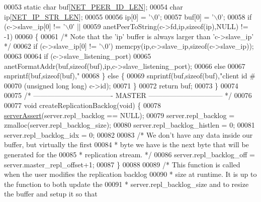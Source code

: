 \begin{DoxyCode}
00053     \textcolor{keyword}{static} \textcolor{keywordtype}{char} buf[\hyperlink{server_8h_a39a30f77e23c1994e70b6c9bc892dee9}{NET\_PEER\_ID\_LEN}];
00054     \textcolor{keywordtype}{char} ip[\hyperlink{server_8h_ad97c5405ed22a94e9fcc10fba577d6c0}{NET\_IP\_STR\_LEN}];
00055 
00056     ip[0] = \textcolor{stringliteral}{'\(\backslash\)0'};
00057     buf[0] = \textcolor{stringliteral}{'\(\backslash\)0'};
00058     \textcolor{keywordflow}{if} (c->slave\_ip[0] != \textcolor{stringliteral}{'\(\backslash\)0'} ||
00059         anetPeerToString(c->fd,ip,\textcolor{keyword}{sizeof}(ip),NULL) != -1)
00060     \{
00061         \textcolor{comment}{/* Note that the 'ip' buffer is always larger than 'c->slave\_ip' */}
00062         \textcolor{keywordflow}{if} (c->slave\_ip[0] != \textcolor{stringliteral}{'\(\backslash\)0'}) memcpy(ip,c->slave\_ip,\textcolor{keyword}{sizeof}(c->slave\_ip));
00063 
00064         \textcolor{keywordflow}{if} (c->slave\_listening\_port)
00065             anetFormatAddr(buf,\textcolor{keyword}{sizeof}(buf),ip,c->slave\_listening\_port);
00066         \textcolor{keywordflow}{else}
00067             snprintf(buf,\textcolor{keyword}{sizeof}(buf),\textcolor{stringliteral}{"%
00068     \} \textcolor{keywordflow}{else} \{
00069         snprintf(buf,\textcolor{keyword}{sizeof}(buf),\textcolor{stringliteral}{"client id #%
00070             (\textcolor{keywordtype}{unsigned} \textcolor{keywordtype}{long} \textcolor{keywordtype}{long}) c->id);
00071     \}
00072     \textcolor{keywordflow}{return} buf;
00073 \}
00074 
00075 \textcolor{comment}{/* ---------------------------------- MASTER -------------------------------- */}
00076 
00077 \textcolor{keywordtype}{void} createReplicationBacklog(\textcolor{keywordtype}{void}) \{
00078     \hyperlink{server_8h_a88114b5169b4c382df6b56506285e56a}{serverAssert}(server.repl\_backlog == NULL);
00079     server.repl\_backlog = zmalloc(server.repl\_backlog\_size);
00080     server.repl\_backlog\_histlen = 0;
00081     server.repl\_backlog\_idx = 0;
00082 
00083     \textcolor{comment}{/* We don't have any data inside our buffer, but virtually the first}
00084 \textcolor{comment}{     * byte we have is the next byte that will be generated for the}
00085 \textcolor{comment}{     * replication stream. */}
00086     server.repl\_backlog\_off = server.master\_repl\_offset+1;
00087 \}
00088 
00089 \textcolor{comment}{/* This function is called when the user modifies the replication backlog}
00090 \textcolor{comment}{ * size at runtime. It is up to the function to both update the}
00091 \textcolor{comment}{ * server.repl\_backlog\_size and to resize the buffer and setup it so that}
}}
\end{DoxyCode}
